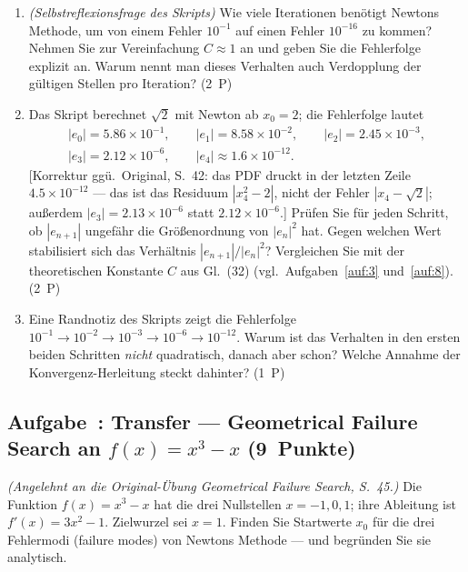 \documentclass[a4paper,11pt]{scrartcl}
\newcounter{aufgabe}
\newcommand{\Aufgabe}[2]{%
  \refstepcounter{aufgabe}%
  \subsection*{Aufgabe~\theaufgabe: #1 \hfill (#2~Punkte)}%
  \label{auf:\theaufgabe}}
\begin{document}
\begin{enumerate}[label=(\alph*)]
  \item \emph{(Selbstreflexionsfrage des Skripts)} Wie viele Iterationen benötigt
  Newtons Methode, um von einem Fehler $10^{-1}$ auf einen Fehler $10^{-16}$ zu kommen?
  Nehmen Sie zur Vereinfachung $C \approx 1$ an und geben Sie die Fehlerfolge explizit
  an. Warum nennt man dieses Verhalten auch \glqq Verdopplung der gültigen Stellen pro
  Iteration\grqq? \hfill (2~P)
  \item Das Skript berechnet $\sqrt{2}$ mit Newton ab $x_0 = 2$; die Fehlerfolge
  lautet
  \begin{gather*}
    |e_0| = 5.86 \times 10^{-1},\qquad |e_1| = 8.58 \times 10^{-2},\qquad
    |e_2| = 2.45 \times 10^{-3},\\
    |e_3| = 2.12 \times 10^{-6},\qquad |e_4| \approx 1.6 \times 10^{-12}.
  \end{gather*}
  [Korrektur ggü.\ Original, S.~42: das PDF druckt in der letzten Zeile
  $4.5 \times 10^{-12}$ --- das ist das Residuum $|x_4^2 - 2|$, nicht der Fehler
  $|x_4 - \sqrt{2}|$; außerdem $|e_3| = 2.13 \times 10^{-6}$ statt
  $2.12 \times 10^{-6}$.]
  Prüfen Sie für jeden Schritt, ob $|e_{n+1}|$ ungefähr die Größenordnung von
  $|e_n|^2$ hat. Gegen welchen Wert stabilisiert sich das Verhältnis
  $|e_{n+1}| / |e_n|^2$? Vergleichen Sie mit der theoretischen Konstante $C$ aus
  Gl.~(32) (vgl.\ Aufgaben~\ref{auf:3} und~\ref{auf:8}).
  \hfill (2~P)
  \item Eine Randnotiz des Skripts zeigt die Fehlerfolge
  $10^{-1} \to 10^{-2} \to 10^{-3} \to 10^{-6} \to 10^{-12}$. Warum ist das Verhalten
  in den ersten beiden Schritten \emph{nicht} quadratisch, danach aber schon? Welche
  Annahme der Konvergenz-Herleitung steckt dahinter? \hfill (1~P)
\end{enumerate}

\schreibraum[8]
\Aufgabe{Transfer --- Geometrical Failure Search an $f(x) = x^3 - x$}{9}

\emph{(Angelehnt an die Original-Übung \glqq Geometrical Failure Search\grqq, S.~45.)}
Die Funktion $f(x) = x^3 - x$ hat die drei Nullstellen $x = -1, 0, 1$; ihre Ableitung ist
$f'(x) = 3x^2 - 1$. Zielwurzel sei $x = 1$. Finden Sie Startwerte $x_0$ für die drei
Fehlermodi (failure modes) von Newtons Methode --- und begründen Sie sie analytisch.
\end{document}
